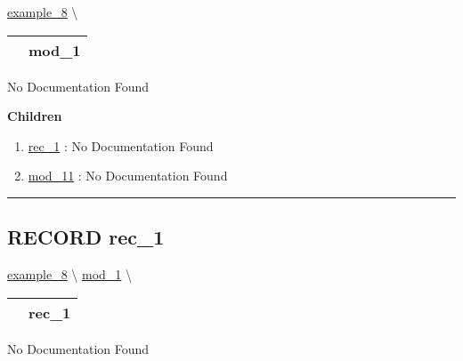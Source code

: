 \hypertarget{ecldoc:example_8.mod_1}{}
\hspace{0pt} \hyperlink{ecldoc:example_8}{example_8} \textbackslash 

{\renewcommand{\arraystretch}{1.5}
\begin{tabularx}{\textwidth}{|>{\raggedright\arraybackslash}l|X|}
\hline
\hspace{0pt}\mytexttt{\color{red} } & \textbf{mod\_1} \\
\hline
\end{tabularx}
}

\par





No Documentation Found







\textbf{Children}
\begin{enumerate}
\item \hyperlink{ecldoc:example_8.mod_1.rec_1}{rec\_1}
: No Documentation Found
\item \hyperlink{ecldoc:example_8.mod_1.mod_11}{mod\_11}
: No Documentation Found
\end{enumerate}

\rule{\linewidth}{0.5pt}

\subsection*{\textsf{\colorbox{headtoc}{\color{white} RECORD}
rec\_1}}

\hypertarget{ecldoc:example_8.mod_1.rec_1}{}
\hspace{0pt} \hyperlink{ecldoc:example_8}{example_8} \textbackslash 
\hspace{0pt} \hyperlink{ecldoc:example_8.mod_1}{mod_1} \textbackslash 

{\renewcommand{\arraystretch}{1.5}
\begin{tabularx}{\textwidth}{|>{\raggedright\arraybackslash}l|X|}
\hline
\hspace{0pt}\mytexttt{\color{red} } & \textbf{rec\_1} \\
\hline
\end{tabularx}
}

\par





No Documentation Found







